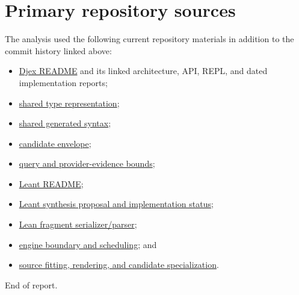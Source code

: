 \documentclass[11pt]{article}
\begin{document}
\section{Primary repository sources}
\label{app:sources}

The analysis used the following current repository materials in addition to the
commit history linked above:

\begin{itemize}
  \item \href{https://github.com/VladimirReshetnikov/Djex/blob/main/README.md}{Djex README}
    and its linked architecture, API, REPL, and dated implementation reports;
  \item \href{https://github.com/VladimirReshetnikov/Djex/blob/main/synthesis/src/Language/Haskell/Synthesis/Type.hs}{shared type representation};
  \item \href{https://github.com/VladimirReshetnikov/Djex/blob/main/synthesis/src/Language/Haskell/Synthesis/Generated.hs}{shared generated syntax};
  \item \href{https://github.com/VladimirReshetnikov/Djex/blob/main/synthesis/src/Language/Haskell/Synthesis/Candidate.hs}{candidate envelope};
  \item \href{https://github.com/VladimirReshetnikov/Djex/blob/main/synthesis/src/Language/Haskell/Synthesis/Query.hs}{query and provider-evidence bounds};
  \item \href{https://github.com/VladimirReshetnikov/Leant/blob/main/README.md}{Leant README};
  \item \href{https://github.com/VladimirReshetnikov/Leant/blob/main/docs/SYNTHESIS_PROPOSAL.md}{Leant synthesis proposal and implementation status};
  \item \href{https://github.com/VladimirReshetnikov/Leant/blob/main/src/Leant/Synth/Fragment.hs}{Lean fragment serializer/parser};
  \item \href{https://github.com/VladimirReshetnikov/Leant/blob/main/src/Leant/Synth/Engine.hs}{engine boundary and scheduling}; and
  \item \href{https://github.com/VladimirReshetnikov/Leant/blob/main/src/Leant/Synth/Render.hs}{source fitting, rendering, and candidate specialization}.
\end{itemize}

\vfill
\begin{center}
\small\sffamily
End of report.
\end{center}
\end{document}
